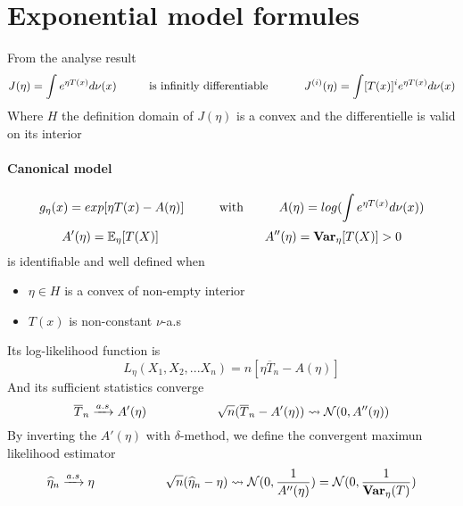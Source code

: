\documentclass[a4paper,10pt]{article}
\begin{document}
\section{Exponential model formules}
From the analyse result
\[
J(\eta)=\int e^{\eta T(x)} d\nu(x) 
\hspace{10mm} \text{is infinitly differentiable } \hspace{10mm}
J^{(i)}(\eta)=\int [T(x)]^i e^{\eta T(x)} d\nu(x) 
\]
Where $H$ the definition domain of $J(\eta)$ is a convex and the differentielle is valid on its interior
\paragraph{Canonical model}
\[
g_{\eta}(x) = exp [\eta T(x) - A(\eta)]
\hspace{10mm} \text{with} \hspace{10mm}
 A(\eta) = log (\int e^{ \eta T(x)}  d\nu(x) ) 
\]
\[
 A'(\eta) = \mathbb{E}_{\eta}[T(X)]  
\hspace{30mm} 
 A''(\eta)= \textbf{Var}_{\eta}[T(X)]  > 0
\]
is identifiable and well defined when 
\begin{itemize}
 \item ${\eta \in H}$ is a convex of non-empty interior
 \item $T(x)$ is non-constant $\nu$-a.s
\end{itemize}
Its log-likelihood function is 
\[
L_{\eta}(X_1,X_2,...X_n) = n[\eta \overline{T}_n -A(\eta)]
\]
And its sufficient statistics converge
\[
\overline{T}_n \xrightarrow{a.s} A'(\eta) 
\hspace{20mm}
\sqrt{n}(\overline{T}_n - A'(\eta) ) \rightsquigarrow   \mathcal{N}(0,A''(\eta))
\]
By inverting the $A'(\eta)$ with $\delta$-method, we define the convergent maximun likelihood estimator 
\[
\widehat{\eta}_n \xrightarrow{a.s} \eta 
\hspace{20mm}
\sqrt{n}(\widehat{\eta}_n - \eta ) \rightsquigarrow   \mathcal{N}(0,\frac{1}{A''(\eta)} ) = \mathcal{N}(0,\frac{1}{\textbf{Var}_{\eta}(T)} )
\]
\end{document}
